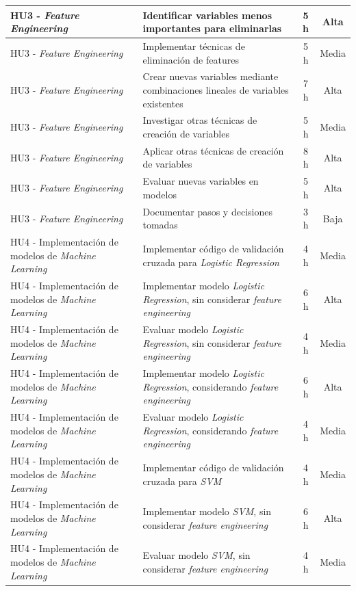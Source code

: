 \documentclass[
11pt, %
]{charter}
\begin{document}
\begin{xltabular}{\linewidth}{@{}|X|X|c|c|@{}}
HU3 - \textit{Feature Engineering} & Identificar variables menos importantes para eliminarlas & 5 h & Alta \\ \hline
HU3 - \textit{Feature Engineering} & Implementar técnicas de eliminación de features & 5 h & Media \\ \hline
HU3 - \textit{Feature Engineering} & Crear nuevas variables mediante combinaciones lineales de variables existentes & 7 h & Alta \\ \hline
HU3 - \textit{Feature Engineering} & Investigar otras técnicas de creación de variables & 5 h & Media \\ \hline
HU3 - \textit{Feature Engineering} & Aplicar otras técnicas de creación de variables & 8 h & Alta \\ \hline
HU3 - \textit{Feature Engineering} & Evaluar nuevas variables en modelos & 5 h & Alta \\ \hline
HU3 - \textit{Feature Engineering} & Documentar pasos y decisiones tomadas & 3 h & Baja \\ \hline
\pagebreak
HU4 - Implementación de modelos de \textit{Machine Learning} & Implementar código de validación cruzada para \textit{Logistic Regression} & 4 h & Media \\ \hline
HU4 - Implementación de modelos de \textit{Machine Learning} & Implementar modelo \textit{Logistic Regression}, sin considerar \textit{feature engineering} & 6 h & Alta \\ \hline
HU4 - Implementación de modelos de \textit{Machine Learning} & Evaluar modelo \textit{Logistic Regression}, sin considerar \textit{feature engineering} & 4 h & Media \\ \hline
HU4 - Implementación de modelos de \textit{Machine Learning} & Implementar modelo \textit{Logistic Regression}, considerando \textit{feature engineering} & 6 h & Alta \\ \hline
HU4 - Implementación de modelos de \textit{Machine Learning} & Evaluar modelo \textit{Logistic Regression}, considerando \textit{feature engineering} & 4 h & Media \\ \hline
HU4 - Implementación de modelos de \textit{Machine Learning} & Implementar código de validación cruzada para \textit{SVM} & 4 h & Media \\ \hline
HU4 - Implementación de modelos de \textit{Machine Learning} & Implementar modelo \textit{SVM}, sin considerar \textit{feature engineering} & 6 h & Alta \\ \hline
HU4 - Implementación de modelos de \textit{Machine Learning} & Evaluar modelo \textit{SVM}, sin considerar \textit{feature engineering} & 4 h & Media \\ \hline

\end{xltabular}
\end{document}

